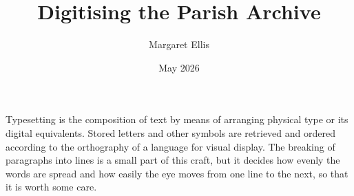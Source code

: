 \documentclass{scrartcl}
\title{Digitising the Parish Archive}
\author{Margaret Ellis}
\date{May 2026}
\begin{document}
\maketitle
Typesetting is the composition of text by means of arranging physical type or its digital equivalents. Stored letters and other symbols are retrieved and ordered according to the orthography of a language for visual display.
\newpage
The breaking of paragraphs into lines is a small part of this craft, but it decides how evenly the words are spread and how easily the eye moves from one line to the next, so that it is worth some care.
\end{document}
